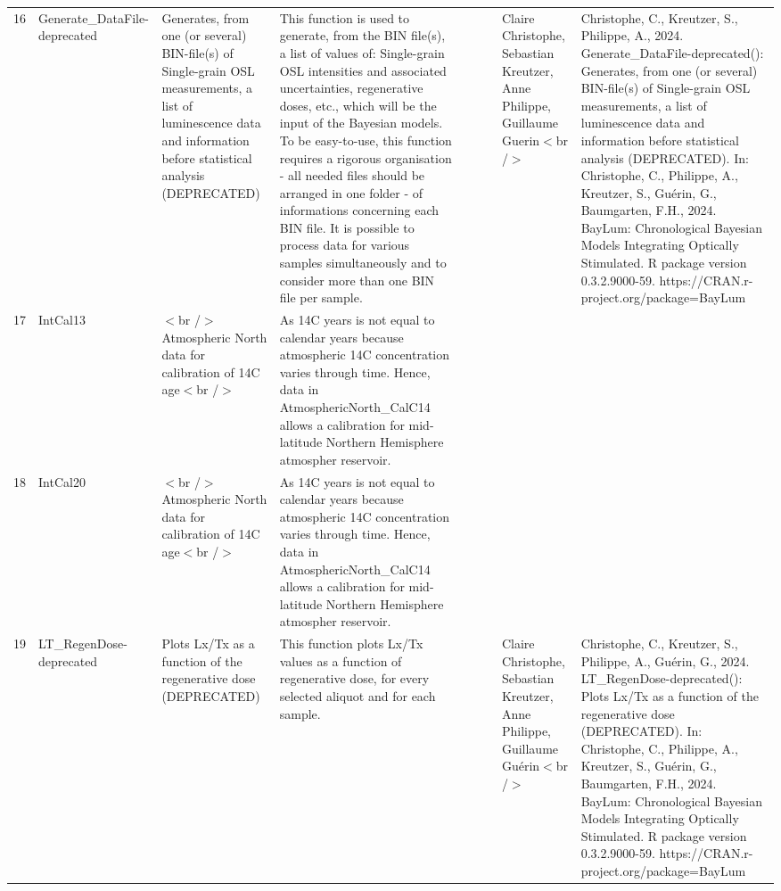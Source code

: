 \begin{table}[ht]
\begin{tabular}{rllllllll}
  16 & Generate\_DataFile-deprecated & Generates, from one (or several) BIN-file(s) of Single-grain OSL measurements, a list of luminescence data and information before statistical analysis (DEPRECATED) & This function is used to generate, from the BIN file(s), a list of values of: Single-grain  OSL intensities and associated uncertainties, regenerative doses, etc., which will be the input of the Bayesian models. To be easy-to-use, this function requires a rigorous organisation - all needed files should be arranged in one folder - of informations concerning each BIN file.   It is possible to process data for various samples simultaneously and to consider more than one BIN file per sample. &  &  &  & Claire Christophe, Sebastian Kreutzer, Anne Philippe, Guillaume Guerin$<$br /$>$ & Christophe, C., Kreutzer, S., Philippe, A., 2024. Generate\_DataFile-deprecated(): Generates, from one (or several) BIN-file(s) of Single-grain OSL measurements, a list of luminescence data and information before statistical analysis (DEPRECATED). In: Christophe, C., Philippe, A., Kreutzer, S., Guérin, G., Baumgarten, F.H., 2024. BayLum: Chronological Bayesian Models Integrating Optically Stimulated. R package version 0.3.2.9000-59. https://CRAN.r-project.org/package=BayLum
 \\ 
  17 & IntCal13 & $<$br /$>$ Atmospheric North data for calibration of 14C age$<$br /$>$ & As 14C years is not equal to calendar years because atmospheric 14C concentration varies through time. Hence, data in AtmosphericNorth\_CalC14 allows a calibration for mid-latitude Northern Hemisphere atmospher reservoir. &  &  &  &  &  \\ 
  18 & IntCal20 & $<$br /$>$ Atmospheric North data for calibration of 14C age$<$br /$>$ & As 14C years is not equal to calendar years because atmospheric 14C concentration varies through time. Hence, data in AtmosphericNorth\_CalC14 allows a calibration for mid-latitude Northern Hemisphere atmospher reservoir. &  &  &  &  &  \\ 
  19 & LT\_RegenDose-deprecated & Plots Lx/Tx as a function of the regenerative dose (DEPRECATED) & This function plots  Lx/Tx  values as a function of regenerative dose, for every selected aliquot and for each sample. &  &  &  & Claire Christophe, Sebastian Kreutzer, Anne Philippe, Guillaume Guérin$<$br /$>$ & Christophe, C., Kreutzer, S., Philippe, A., Guérin, G., 2024. LT\_RegenDose-deprecated(): Plots Lx/Tx as a function of the regenerative dose (DEPRECATED). In: Christophe, C., Philippe, A., Kreutzer, S., Guérin, G., Baumgarten, F.H., 2024. BayLum: Chronological Bayesian Models Integrating Optically Stimulated. R package version 0.3.2.9000-59. https://CRAN.r-project.org/package=BayLum

\end{tabular}
\end{table}
